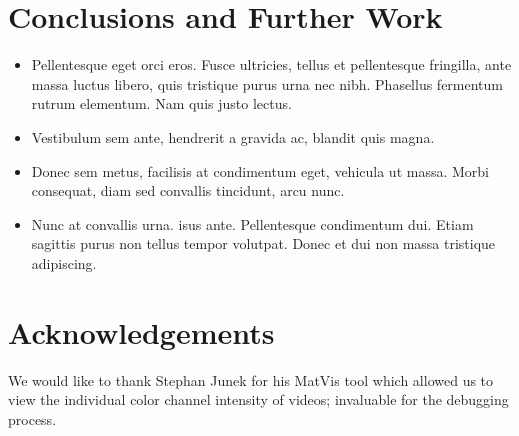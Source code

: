 \documentclass[a0,landscape]{a0poster}
\begin{document}
\begin{multicols}{4}
\section*{Conclusions and Further Work}

\begin{itemize}
\item Pellentesque eget orci eros. Fusce ultricies, tellus et pellentesque fringilla, ante massa luctus libero, quis tristique purus urna nec nibh. Phasellus fermentum rutrum elementum. Nam quis justo lectus.
\item Vestibulum sem ante, hendrerit a gravida ac, blandit quis magna.
\item Donec sem metus, facilisis at condimentum eget, vehicula ut massa. Morbi consequat, diam sed convallis tincidunt, arcu nunc.
\item Nunc at convallis urna. isus ante. Pellentesque condimentum dui. Etiam sagittis purus non tellus tempor volutpat. Donec et dui non massa tristique adipiscing.
\end{itemize}

\color{DarkSlateGray} %



\nocite{*} %


\section*{Acknowledgements}

We would like to thank Stephan Junek for his MatVis tool which allowed us to view the individual color channel intensity of videos; invaluable for the debugging process.


\end{multicols}
\end{document}
